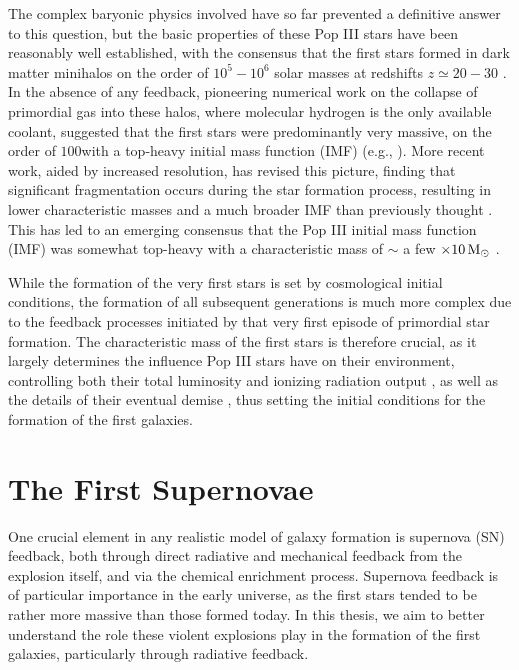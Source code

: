 \documentclass[../thesis.tex]{subfiles}
\begin{document}
The complex baryonic physics involved have so far prevented a definitive answer to this question, but the basic properties of these Pop III stars have been reasonably well established, with the consensus that the first stars formed in dark matter minihalos on the order of $10^5-10^6$ solar masses at redshifts $z \simeq 20-30$ \citep{CouchmanRees1986,   HaimanThoulLoeb1996, Tegmarketal1997}.  
In the absence of any feedback, pioneering numerical work on the collapse of primordial gas into these halos, where molecular hydrogen is the only available coolant, suggested that the first stars were predominantly very massive, on the order of $100$\msun with a top-heavy initial mass function (IMF) (e.g., \citealt{BrommCoppiLarson1999, BrommCoppiLarson2002, AbelBryanNorman2002, BrommLarson2004, Yoshidaetal2006, OSheaNorman2007}).  
More recent work, aided by increased resolution, has revised this picture, finding that significant fragmentation occurs during the star formation process, resulting in lower characteristic masses and a much broader IMF than previously thought \citep{StacyGreifBromm2010,Clarketal2011a,Clarketal2011b,Greifetal2011,Greifetal2012,StacyBromm2013,Hiranoetal2014,Hosokawaetal2015}. This has led to an emerging consensus that the Pop III initial mass function (IMF) was somewhat top-heavy with a characteristic mass of $\sim$ a few $\times 10\,\mathrm{M}_{\odot}$ \citep{Bromm2013}. 

While the formation of the very first stars is set by cosmological initial conditions, the formation of all subsequent generations is much more complex due to the feedback processes initiated by that very first episode of primordial star formation.
The characteristic mass of the first stars is therefore crucial, as it largely determines the influence Pop III stars have on their environment, controlling both their total luminosity and ionizing radiation output \citep{Schaerer2002}, as well as the details of their eventual demise \citep{Hegeretal2003,HegerWoosley2010,MaederMeynet2012}, thus setting the initial conditions for the formation of the first galaxies.

\section{The First Supernovae}
One crucial element in any realistic model of galaxy formation is supernova (SN) feedback, both through direct radiative and mechanical feedback from the explosion itself, and via the chemical enrichment process. 
Supernova feedback is of particular importance in the early universe, as the first stars tended to be rather more massive than those formed today. 
In this thesis, we aim to better understand the role these violent explosions play in the formation of the first galaxies, particularly through radiative feedback.
\end{document}
